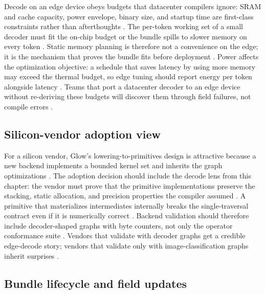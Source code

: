 Decode on an edge device obeys budgets that datacenter compilers ignore: SRAM and cache capacity, power envelope, binary size, and startup time are first-class constraints rather than afterthoughts \citep{dlbook,amd2024aie}. The per-token working set of a small decoder must fit the on-chip budget or the bundle spills to slower memory on every token \citep{memoryfloor2026,taxbreak2026}. Static memory planning is therefore not a convenience on the edge; it is the mechanism that proves the bundle fits before deployment \citep{rotem2018glow,dlbook}. Power affects the optimization objective: a schedule that saves latency by using more memory may exceed the thermal budget, so edge tuning should report energy per token alongside latency \citep{patel2025llminference,memoryfloor2026}. Teams that port a datacenter decoder to an edge device without re-deriving these budgets will discover them through field failures, not compile errors \citep{chen2020compilerbasedhardw,amd2024aie}.

\subsection{Silicon-vendor adoption view}

For a silicon vendor, Glow's lowering-to-primitives design is attractive because a new backend implements a bounded kernel set and inherits the graph optimizations \citep{rotem2018glow,amd2024aie}. The adoption decision should include the decode lens from this chapter: the vendor must prove that the primitive implementations preserve the stacking, static allocation, and precision properties the compiler assumed \citep{memoryfloor2026,patel2025llminference}. A primitive that materializes intermediates internally breaks the single-traversal contract even if it is numerically correct \citep{rotem2018glow,memoryfloor2026}. Backend validation should therefore include decoder-shaped graphs with byte counters, not only the operator conformance suite \citep{chen2020compilerbasedhardw,taxbreak2026}. Vendors that validate with decoder graphs get a credible edge-decode story; vendors that validate only with image-classification graphs inherit surprises \citep{patel2025llminference,memoryfloor2026}.

\subsection{Bundle lifecycle and field updates}

